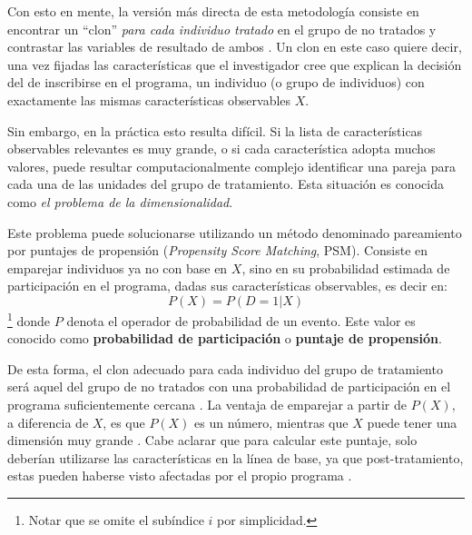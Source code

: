 \documentclass[../../main.tex]{subfiles}
\begin{document}
Con esto en mente, la versión más directa de esta metodología consiste en encontrar un
``clon'' \textit{para cada individuo tratado} en el grupo de no tratados y contrastar las
variables de resultado de ambos \cite{bernal}. Un clon en este caso quiere decir, una vez
fijadas las características que el investigador cree que explican la decisión del de
inscribirse en el programa, un individuo (o grupo de individuos) con exactamente las
mismas características observables \(X\).

Sin embargo, en la práctica esto resulta difícil. Si la lista de características
observables relevantes es muy grande, o si cada característica adopta muchos valores,
puede resultar computacionalmente complejo identificar una pareja para cada una de las
unidades del grupo de tratamiento. Esta situación es conocida como \textit{el problema de
la dimensionalidad}.

Este problema puede solucionarse utilizando un método denominado pareamiento por puntajes
de propensión (\textit{Propensity Score Matching}, PSM). Consiste en emparejar individuos
ya no con base en \(X\), sino en su probabilidad estimada de participación en el programa,
dadas sus características observables, es decir en:
\[P(X) = P(D = 1|X)\] \footnote{Notar que se omite el subíndice \(i\) por simplicidad.}
donde \(P\) denota el operador de probabilidad de un evento. Este
valor es conocido como \textbf{probabilidad de participación} o \textbf{puntaje de
propensión}.

De esta forma, el clon adecuado para cada individuo del grupo de tratamiento
será aquel del grupo de no tratados con una probabilidad de participación en el programa
suficientemente cercana \cite{bernal}. La ventaja de emparejar a partir de \(P(X)\), a
diferencia de \(X\), es que \(P(X)\) es un número, mientras que \(X\) puede tener una
dimensión muy grande \cite{bernal}. Cabe aclarar que para calcular este puntaje, solo
deberían utilizarse las características en la línea de base, ya que post-tratamiento,
estas pueden haberse visto afectadas por el propio programa \cite{gertler-2016}.

\end{document}
